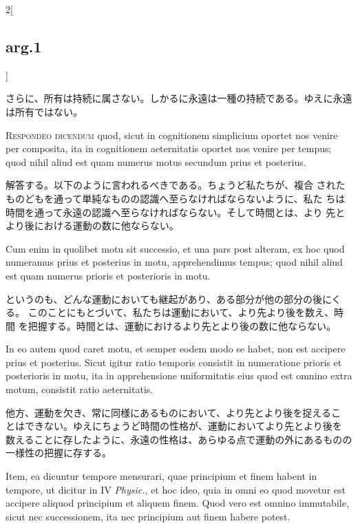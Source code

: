 \documentclass[paper=a4paper,fontsize=10pt,jafontsize=9pt,titlepage]{jlreq}
\begin{document}
\begin{paracol}{2}[\subsection{arg.1}]
\switchcolumn

さらに、所有は持続に属さない。しかるに永遠は一種の持続である。ゆえに永遠
は所有ではない。


{\scshape Respondeo dicendum} quod, sicut in cognitionem simplicium oportet nos
venire per composita, ita in cognitionem aeternitatis oportet nos venire
per tempus; quod nihil aliud est quam numerus motus secundum prius et
posterius.

\switchcolumn

解答する。以下のように言われるべきである。ちょうど私たちが、複合
されたものどもを通って単純なものの認識へ至らなければならないように、私た
ちは時間を通って永遠の認識へ至らなければならない。そして時間とは、より
先とより後における運動の数に他ならない。

\switchcolumn*

Cum enim in quolibet motu sit successio, et una pars post alteram, ex
hoc quod numeramus prius et posterius in motu, apprehendimus tempus;
quod nihil aliud est quam numerus prioris et posterioris in motu.

\switchcolumn

というのも、どんな運動においても継起があり、ある部分が他の部分の後にくる。
このことにもとづいて、私たちは運動において、より先より後を数え、時間
を把握する。時間とは、運動におけるより先とより後の数に他ならない。

\switchcolumn*

In eo autem quod caret motu, et semper eodem modo se habet, non est
accipere prius et posterius. Sicut igitur ratio temporis consistit in
numeratione prioris et posterioris in motu, ita in apprehensione
uniformitatis eius quod est omnino extra motum, consistit ratio
aeternitatis.

\switchcolumn

他方、運動を欠き、常に同様にあるものにおいて、より先とより後を捉えるこ
とはできない。ゆえにちょうど時間の性格が、運動においてより先とより後を
数えることに存したように、永遠の性格は、あらゆる点で運動の外にあるものの
一様性の把握に存する。

\switchcolumn*

Item, ea dicuntur tempore mensurari, quae principium et finem
habent in tempore, ut dicitur in IV {\itshape Physic.}, et hoc ideo, quia in
omni eo quod movetur est accipere aliquod principium et aliquem
finem. Quod vero est omnino immutabile, sicut nec successionem, ita nec
principium aut finem habere potest.


\end{paracol}
\end{document}

